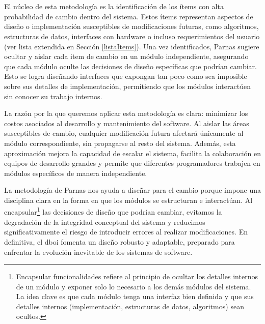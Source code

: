 \noindent{} 
\\\\
\indent
El núcleo de esta metodología es la identificación de los ítems con alta probabilidad de cambio dentro del sistema. Estos ítems representan aspectos de diseño o implementación susceptibles de modificaciones futuras, como algoritmos, estructuras de datos, interfaces con hardware o incluso requerimientos del usuario (ver lista extendida en Sección \ref{listaItems}). Una vez identificados, Parnas sugiere ocultar y aislar cada item de cambio en un módulo independiente, asegurando que cada módulo oculte las decisiones de diseño específicas que podrían cambiar. Esto se logra diseñando interfaces que expongan tan poco como sea imposible sobre sus detalles de implementación, permitiendo que los módulos interactúen sin conocer su trabajo internos. 

La razón por la que queremos aplicar esta metodología es clara: minimizar los costos asociados al desarrollo y mantenimiento del software. Al aislar las áreas susceptibles de cambio, cualquier modificación futura afectará únicamente al módulo correspondiente, sin propagarse al resto del sistema. Además, esta aproximación mejora la capacidad de escalar el sistema, facilita la colaboración en equipos de desarrollo grandes y permite que diferentes programadores trabajen en módulos específicos de manera independiente.

La metodología de Parnas nos ayuda a diseñar para el cambio porque impone una disciplina clara en la forma en que los módulos se estructuran e interactúan. Al encapsular\footnote{Encapsular funcionalidades refiere al principio de ocultar los detalles internos de un módulo y exponer solo lo necesario a los demás módulos del sistema. La idea clave es que cada módulo tenga una interfaz bien definida y que sus detalles internos (implementación, estructuras de datos, algoritmos) sean ocultos.} las decisiones de diseño que podrían cambiar, evitamos la degradación de la integridad conceptual del sistema y reducimos significativamente el riesgo de introducir errores al realizar modificaciones. En definitiva, el \gls{dboi} fomenta un diseño robusto y adaptable, preparado para enfrentar la evolución inevitable de los sistemas de software.


